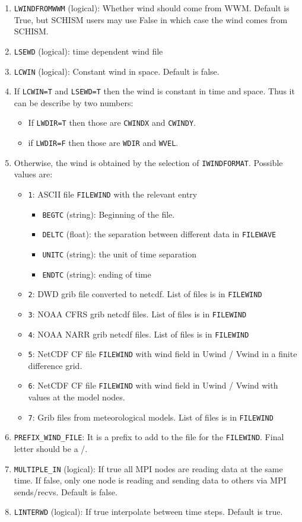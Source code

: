 \documentclass[12pt]{amsart}
\begin{document}
\begin{enumerate}
\item {\tt LWINDFROMWWM} (logical): Whether wind should come from WWM. Default is True, but SCHISM users may use False in which case the wind comes from SCHISM.
\item {\tt LSEWD} (logical): time dependent wind file
\item {\tt LCWIN} (logical): Constant wind in space. Default is false.
\item If {\tt LCWIN=T} and {\tt LSEWD=T} then the wind is constant in time and space. Thus it can be describe by two numbers:
  \begin{itemize}
  \item If {\tt LWDIR=T} then those are {\tt CWINDX} and {\tt CWINDY}.
  \item if {\tt LWDIR=F} then those are {\tt WDIR} and {\tt WVEL}.
  \end{itemize}
\item Otherwise, the wind is obtained by the selection of {\tt IWINDFORMAT}. Possible values are:
  \begin{itemize}
  \item {\tt 1}: ASCII file {\tt FILEWIND} with the relevant entry
    \begin{itemize}
    \item {\tt BEGTC} (string): Beginning of the file.
    \item {\tt DELTC} (float): the separation between different data in {\tt FILEWAVE}
    \item {\tt UNITC} (string): the unit of time separation
    \item {\tt ENDTC} (string): ending of time 
    \end{itemize}
  \item {\tt 2}: DWD grib file converted to netcdf. List of files is in {\tt FILEWIND}
  \item {\tt 3}: NOAA CFRS grib netcdf files. List of files is in {\tt FILEWIND}
  \item {\tt 4}: NOAA NARR grib netcdf files. List of files is in {\tt FILEWIND}
  \item {\tt 5}: NetCDF CF file {\tt FILEWIND} with wind field in Uwind / Vwind in a finite difference grid.
  \item {\tt 6}: NetCDF CF file {\tt FILEWIND} with wind field in Uwind / Vwind with values at the model nodes.
  \item {\tt 7}: Grib files from meteorological models. List of files is in {\tt FILEWIND}
  \end{itemize}
\item {\tt PREFIX\_WIND\_FILE}: It is a prefix to add to the file for the {\tt FILEWIND}. Final letter should be a /.
\item {\tt MULTIPLE\_IN} (logical): If true all MPI nodes are reading data at the same time. If false, only one node is reading and sending data to others via MPI sends/recvs. Default is false.
\item {\tt LINTERWD} (logical): If true interpolate between time steps. Default is true.
\end{enumerate}
\end{document}
